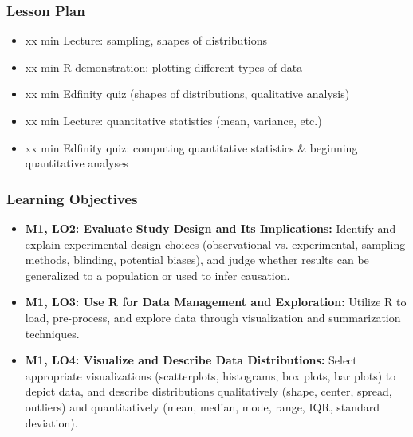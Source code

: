 \begin{frame}
    \frametitle{Lesson Plan}
    \begin{itemize}
        \item xx min Lecture: sampling, shapes of distributions
        \item xx min R demonstration: plotting different types of data
        \item xx min Edfinity quiz (shapes of distributions, qualitative analysis)
        \item xx min Lecture: quantitative statistics (mean, variance, etc.)
        \item xx min Edfinity quiz: computing quantitative statistics & beginning quantitative analyses
    \end{itemize}
\end{frame}
    
\begin{frame}
    \frametitle{Learning Objectives}
    \begin{itemize}
        \item \textbf{M1, LO2: Evaluate Study Design and Its Implications:} Identify and explain experimental design choices (observational vs. experimental, sampling methods, blinding, potential biases), and judge whether results can be generalized to a population or used to infer causation. 
        \item \textbf{M1, LO3: Use R for Data Management and Exploration:} Utilize R to load, pre-process, and explore data through visualization and summarization techniques.
        \item \textbf{M1, LO4: Visualize and Describe Data Distributions:} Select appropriate visualizations (scatterplots, histograms, box plots, bar plots) to depict data, and describe distributions qualitatively (shape, center, spread, outliers) and quantitatively (mean, median, mode, range, IQR, standard deviation).
    \end{itemize}
\end{frame}



